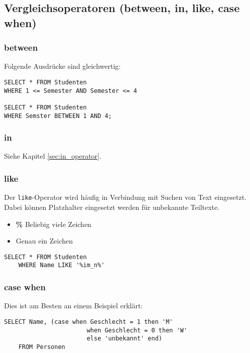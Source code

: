 \subsection{Vergleichsoperatoren (between, in, like, case when)}
\subsubsection{between}
Folgende Ausdrücke sind gleichwertig:

\begin{lstlisting}[caption={Beispiel between}]
SELECT * FROM Studenten
WHERE 1 <= Semester AND Semester <= 4
        
SELECT * FROM Studenten
WHERE Semster BETWEEN 1 AND 4;
\end{lstlisting}

\subsubsection{in}
Siehe Kapitel \ref{sec:in_operator}.

\subsubsection{like}
Der \texttt{like}-Operator wird häufig in Verbindung mit Suchen von Text eingesetzt. Dabei können Platzhalter eingesetzt werden für unbekannte Teiltexte.
\begin{itemize}
  \item \textbf{\%} Beliebig viele Zeichen
  \item \textbf{\underline {{ }{ }}} Genau ein Zeichen
\end{itemize}

\begin{lstlisting}[caption={Beispiel für like Operator}]
    SELECT * FROM Studenten
    WHERE Name LIKE '%im_n%'
\end{lstlisting}

\subsubsection{case when}
Dies ist am Besten an einem Beispiel erklärt:

\begin{lstlisting}[caption={Beispiel für case when}]
    SELECT Name, (case when Geschlecht = 1 then 'M'
                       when Geschlecht = 0 then 'W'
                       else 'unbekannt' end)
    FROM Personen
\end{lstlisting}

